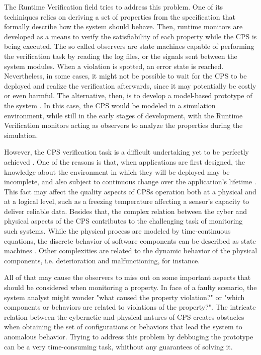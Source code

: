 The Runtime Verification field \cite{colombo2021runtime} tries to address this problem. One of its techiniques relies on deriving a set of properties from the specification that formally describe how the system should behave. Then, runtime monitors are developed as a means to verify the satisfiability of each property while the CPS is being executed. The so called observers are state machines capable of performing the verification task by reading the log files, or the signals sent between the system modules. When a violation is spotted, an error state is reached. Nevertheless, in some cases, it might not be possible to wait for the CPS to be deployed and realize the verification afterwards, since it may potentially be costly or even harmful. The alternative, then, is to develop a model-based prototype of the system \cite{mohamed2021model}. In this case, the CPS would be modeled in a simulation environment, while still in the early stages of development, with the Runtime Verification monitors acting as observers to analyze the properties during the simulation.

However, the CPS verification task is a difficult undertaking yet to be perfectly achieved \cite{patankar2020safety}. One of the reasons is that, when applications are first designed, the knowledge about the environment in which they will be deployed may be incomplete, and also subject to continuous change over the application's lifetime \cite{assurances2017}. This fact may affect the quality aspects of CPSs operation both at a physical and at a logical level, such as a freezing temperature affecting a sensor's capacity to deliver reliable data. Besides that, the complex relation between the cyber and physical aspects of the CPS contributes to the challenging task of monitoring such systems. While the physical process are modeled by time-continuous equations, the discrete behavior of software components can be described as state machines \cite{Baheti2019CyberPhysicalS}. Other complexities are related to the dynamic behavior of the physical components, i.e. deterioration and malfunctioning, for instance.

All of that may cause the observers to miss out on some important aspects that should be considered when monitoring a property. In face of a faulty scenario, the system analyst might wonder "what caused the property violation?" or "which components or behaviors are related to violations of the property?". The intricate relation between the cybernetic and physical natures of CPS creates obstacles when obtaining the set of configurations or behaviors that lead the system to anomalous behavior. Trying to address this problem by debbuging the prototype can be a very time-consuming task, whithout any guarantees of solving it.

